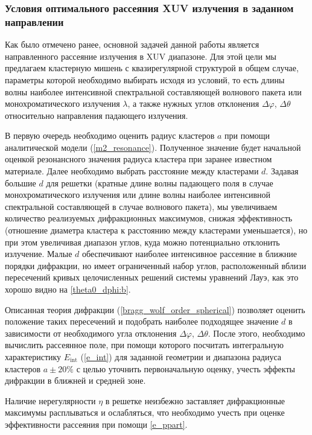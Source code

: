 \subsubsection{Условия оптимального рассеяния XUV излучения в заданном направлении}

Как было отмечено ранее, основной задачей данной работы является направленного рассеяние излучения в XUV диапазоне. Для этой цели мы предлагаем кластерную мишень с квазирегулярной структурой в общем случае, параметры которой необходимо выбирать исходя из условий, то есть длины волны наиболее интенсивной спектральной составляющей волнового пакета или монохроматического излучения $\lambda$, а также нужных углов отклонения $\Delta \varphi$, $\Delta \theta$ относительно направления падающего излучения. 

В первую очередь необходимо оценить радиус кластеров $a$ при помощи аналитической модели (\autoref{m2_resonance}). Полученное значение будет начальной оценкой резонансного значения радиуса кластера при заранее известном материале. Далее необходимо выбрать расстояние между кластерами $d$. Задавая большие $d$ для решетки (кратные длине волны падающего поля в случае монохроматического излучения или длине волны наиболее интенсивной спектральной составляющей в случае волнового пакета), мы увеличиваем количество реализуемых дифракционных максимумов, снижая эффективность (отношение диаметра кластера к расстоянию между кластерами уменьшается), но при этом увеличивая диапазон углов, куда можно потенциально отклонить излучение. Малые $d$ обеспечивают наиболее интенсивное рассеяние в ближние порядки дифракции, но имеет ограниченный набор углов, расположенный вблизи пересечений кривых целочисленных решений системы уравнений Лауэ, как это хорошо видно на \autoref{theta0_dphi:b}. 

Описанная теория дифракции (\autoref{bragg_wolf_order_spherical}) позволяет оценить положение таких пересечений и подобрать наиболее подходящее значение $d$ в зависимости от необходимого угла отклонения $\Delta \varphi$, $\Delta \theta$. После этого, необходимо вычислить рассеянное поле, при помощи которого посчитать интегральную характеристику $E_{\textrm{int}}$ (\autoref{e_int}) для заданной геометрии и диапазона радиуса кластеров $a\pm20\%$ с целью уточнить первоначальную оценку, учесть эффекты дифракции в ближней и средней зоне.

Наличие нерегулярности $\eta$ в решетке неизбежно заставляет дифракционные максимумы расплываться и ослабляться, что необходимо учесть при оценке эффективности рассеяния при помощи \autoref{e_ppart}.
